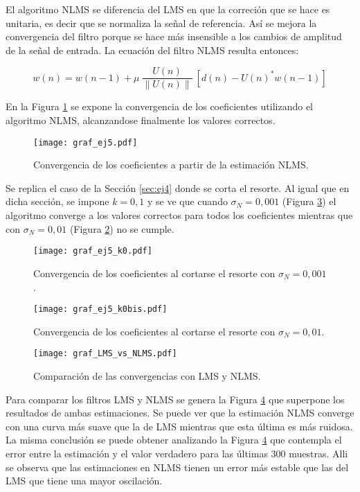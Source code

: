 
	El algoritmo NLMS se diferencia del LMS en que la correción que se hace es unitaria, es decir que se normaliza la señal de referencia. Así se mejora la convergencia del filtro porque se hace más insensible a los cambios de amplitud de la señal de entrada. La ecuación del filtro NLMS resulta entonces: 

	\begin{equation*}
		w(n) = w(n - 1) + \mu \> \frac{U(n)}{\|U(n)\|} \> [d(n) - U(n)^* w(n - 1)]
	\end{equation*}

	
	En la Figura \ref{fig:ej5} se expone la convergencia de los coeficientes utilizando el algoritmo NLMS, alcanzandose finalmente los valores correctos.
	\begin{figure}[h!]
		\centering
		\texttt{[image: graf\_ej5.pdf]}
		\caption{Convergencia de los coeficientes a partir de la estimación NLMS.}
		\label{fig:ej5}
	\end{figure}

	Se replica el caso de la Sección \ref{sec:ej4} donde se corta el resorte. Al igual que en dicha sección, se impone $k=0,1$ y se ve que cuando $\sigma_N=0,001$ (Figura \ref{fig:ej5_k01}) el algoritmo converge a los valores correctos para todos los coeficientes mientras que con $\sigma_N=0,01$ (Figura \ref{fig:ej5_k0}) no se cumple. 
	
	\begin{figure}[h!]
		\centering
		\texttt{[image: graf\_ej5\_k0.pdf]}
		\caption{Convergencia de los coeficientes al cortarse el resorte con $\sigma_N=0,001$.}
		\label{fig:ej5_k0}
	\end{figure}
	
	\begin{figure}[h!]
		\centering
		\texttt{[image: graf\_ej5\_k0bis.pdf]}
		\caption{Convergencia de los coeficientes al cortarse el resorte con $\sigma_N=0,01$.}
		\label{fig:ej5_k01}
	\end{figure}

	\pagebreak

	\begin{figure}[h!]
		\centering
		\texttt{[image: graf\_LMS\_vs\_NLMS.pdf]}
		\caption{Comparación de las convergencias con LMS y NLMS.}
		\label{fig:ej5_comp}
	\end{figure}

	Para comparar los filtros LMS y NLMS se genera la Figura \ref{fig:ej5_comp} que superpone los resultados de ambas estimaciones. Se puede ver que la estimación NLMS converge con una curva más suave que la de LMS mientras que esta última es más ruidosa. La misma conclusión se puede obtener analizando la Figura \ref{fig:ej5_comp} que contempla el error entre la estimación y el valor verdadero para las últimas 300 muestras. Alli se observa que las estimaciones en NLMS tienen un error más estable que las del LMS que tiene una mayor oscilación.

